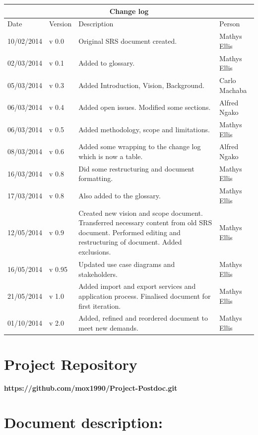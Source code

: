 \documentclass[12pt]{article}
\newcommand{\repo}{https://github.com/mox1990/Project-Postdoc.git}
\begin{document}
\begin{center}
\begin{tabular}{|l|p{1.4cm}|p{8cm}|p{2.8cm}|}
\hline
\multicolumn{4}{|c|}{\bf Change log} \\
\hline
 Date & Version & Description &  Person \\
\hline
10/02/2014 & v 0.0 & Original SRS document created. & Mathys Ellis \\
\hline
02/03/2014 & v 0.1 & Added to glossary. & Mathys Ellis \\
\hline
05/03/2014 & v 0.3 & Added Introduction, Vision, Background. & Carlo Machaba \\
\hline
06/03/2014 & v 0.4 & Added open issues. Modified some sections. & Alfred Ngako \\
\hline
06/03/2014 & v 0.5 & Added methodology, scope and limitations. & Mathys Ellis \\
\hline
08/03/2014 & v 0.6 & Added some wrapping to the change log which is now a table. & Alfred Ngako \\
\hline
16/03/2014 & v 0.8 & Did some restructuring and document formatting. & Mathys Ellis \\
\hline
17/03/2014 & v 0.8 & Also added to the glossary. & Mathys Ellis \\
\hline
12/05/2014 & v 0.9 & Created new vision and scope document. Transferred necessary content from old SRS document. Performed editing and restructuring of document. Added exclusions. & Mathys Ellis \\
\hline
16/05/2014 & v 0.95 & Updated use case diagrams and stakeholders. & Mathys Ellis \\
\hline
21/05/2014 & v 1.0 & Added import and export services and application process. Finalised document for first iteration. & Mathys Ellis \\
\hline
01/10/2014 & v 2.0 & Added, refined and reordered document to meet new demands. & Mathys Ellis \\
\hline

\end{tabular}
\end{center}
\newpage
\tableofcontents

\listoffigures
\newpage
\section{Project Repository}
\textbf{\repo}
\newpage
\section{Document description:}
\end{document}
